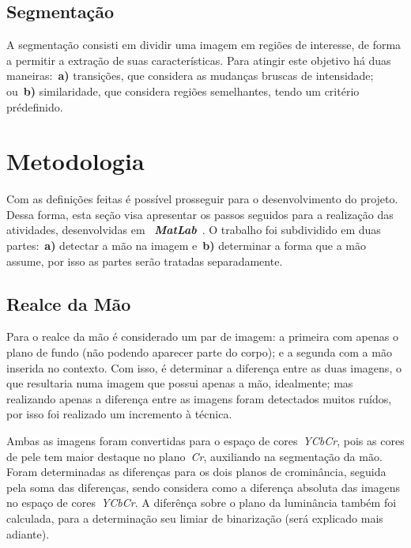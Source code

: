 \documentclass[conference]{Trabalho_Final}
\begin{document}
\subsection{Segmenta\c{c}\~ao}
  \label{subsec:segmenta}
A segmenta\c{c}\~ao consisti em dividir uma imagem em regi\~oes de interesse, de forma a permitir a extra\c{c}\~ao de suas caracter\'isticas. Para atingir este objetivo h\'a duas maneiras:~\textbf{a)} transi\c{c}\~oes, que considera as mudan\c{c}as bruscas de intensidade; ou~\textbf{b)} similaridade, que considera regi\~oes semelhantes, tendo um crit\'erio pr\'edefinido.


\section{Metodologia}
  \label{metodo}
Com as defini\c{c}\~oes feitas \'e poss\'ivel prosseguir para o desenvolvimento do projeto. Dessa forma, esta se\c{c}\~ao visa apresentar os passos seguidos para a realiza\c{c}\~ao das atividades, desenvolvidas em ~\textbf{\textit{MatLab}}~\cite{matlab}. O trabalho foi subdividido em duas partes:~\textbf{a)} detectar a m\~ao na imagem e~\textbf{b)} determinar a forma que a m\~ao assume, por isso as partes ser\~ao tratadas separadamente.

\subsection{Realce da M\~ao}
  \label{subsec:realce1}
Para o realce da m\~ao \'e considerado um par de imagem: a primeira com apenas o plano de fundo (n\~ao podendo aparecer parte do corpo); e a segunda com a m\~ao inserida no contexto. Com isso, \'e determinar a diferen\c{c}a entre as duas imagens, o que resultaria numa imagem que possui apenas a m\~ao, idealmente; mas realizando apenas a diferen\c{c}a entre as imagens foram detectados muitos ru\'idos, por isso foi realizado um incremento \`a t\'ecnica.

Ambas as imagens foram convertidas para o espa\c{c}o de cores~\textit{YCbCr}, pois as cores de pele tem maior destaque no plano~\textit{Cr}, auxiliando na segmenta\c{c}\~ao da m\~ao. Foram determinadas as diferen\c{c}as para os dois planos de cromin\^ancia, seguida pela soma das diferen\c{c}as, sendo considera como a diferen\c{c}a absoluta das imagens no espa\c{c}o de cores~\textit{YCbCr}. A difer\^en\c{c}a sobre o plano da lumin\^ancia tamb\'em foi calculada, para a determina\c{c}\~ao seu limiar de binariza\c{c}\~ao (ser\'a explicado mais adiante).
\end{document}
